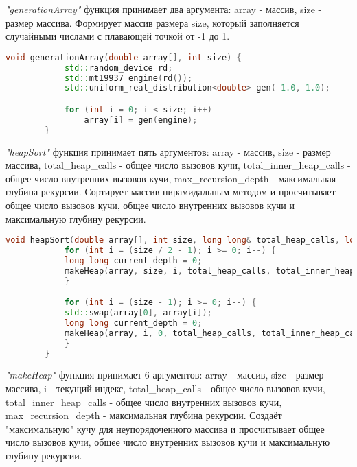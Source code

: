 \documentclass[12pt, a4paper]{report}
\begin{document}
	\par
	\textit{"generationArray"} функция принимает два аргумента: array - массив, size - размер массива. Формирует массив размера size, который заполняется случайными числами с плавающей точкой от -1 до 1.
	\lstset{style=mystyle}
	\begin{lstlisting}[language=C++]
		void generationArray(double array[], int size) {
			std::random_device rd;
			std::mt19937 engine(rd());
			std::uniform_real_distribution<double> gen(-1.0, 1.0);

			for (int i = 0; i < size; i++)
				array[i] = gen(engine);
		}		
	\end{lstlisting}
	\par
	\textit{"heapSort"} функция принимает пять аргументов: array - массив, size - размер массива, total\_heap\_calls - общее число вызовов кучи, total\_inner\_heap\_calls - общее число внутренних вызовов кучи, max\_recursion\_depth - максимальная глубина рекурсии. Сортирует массив пирамидальным методом и просчитывает общее число вызовов кучи, общее число внутренних вызовов кучи и максимальную глубину рекурсии.
	\lstset{style=mystyle}
	\begin{lstlisting}[language=C++]
		void heapSort(double array[], int size, long long& total_heap_calls, long long& total_inner_heap_calls, long long& max_recursion_depth) {
		    for (int i = (size / 2 - 1); i >= 0; i--) {
			long long current_depth = 0;
			makeHeap(array, size, i, total_heap_calls, total_inner_heap_calls, current_depth, max_recursion_depth);
		    }

		    for (int i = (size - 1); i >= 0; i--) {
			std::swap(array[0], array[i]);
			long long current_depth = 0;
			makeHeap(array, i, 0, total_heap_calls, total_inner_heap_calls, current_depth, max_recursion_depth);
		    }
		}
	\end{lstlisting}
	\par
	\textit{"makeHeap"} функция принимает 6 аргументов: array - массив, size - размер массива, i - текущий индекс, total\_heap\_calls - общее число вызовов кучи, total\_inner\_heap\_calls - общее число внутренних вызовов кучи, max\_recursion\_depth - максимальная глубина рекурсии. Создаёт "максимальную" кучу для неупорядоченного массива и просчитывает общее число вызовов кучи, общее число внутренних вызовов кучи и максимальную глубину рекурсии.
	\lstset{style=mystyle}
\end{document}
